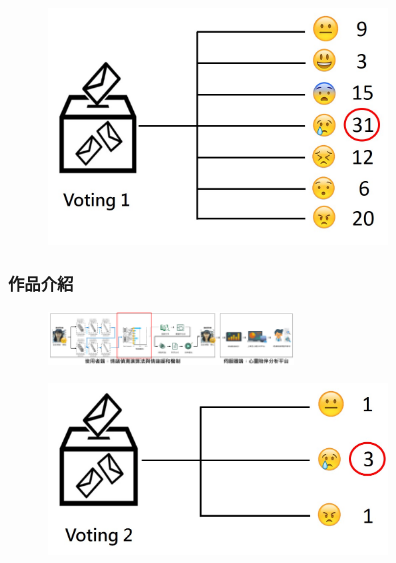 \documentclass[10pt, conference, compsocconf]{beamer}
\begin{document}
\begin{CJK}{UTF8}{}
\begin{frame}
\vspace{-5mm}
\begin{figure}[!t]
\begin{center}
\includegraphics[width=9cm]{./Figures/502.jpg}
\end{center}
\end{figure}

\end{frame}

\begin{frame}
\frametitle{作品介紹}
\begin{figure}[t]
\begin{flushright}
\vspace{-9mm}
\includegraphics[width=6.5cm]{./Figures/framework_version4_3.pdf}
\end{flushright}
\end{figure}

\vspace{-3mm}
\begin{figure}[!t]
\begin{center}
\includegraphics[width=9cm]{./Figures/503.jpg}
\end{center}
\end{figure}


\end{frame}
\end{CJK}
\end{document}
